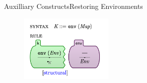 \documentclass{beamer}
\begin{document}
\begin{frame}{Auxilliary Constructs}{Restoring Environments}
    \begin{figure}[H]
        \centering
    \includegraphics[width=0.4\textwidth]{restore-env}
    \end{figure}
\end{frame}
\end{document}
